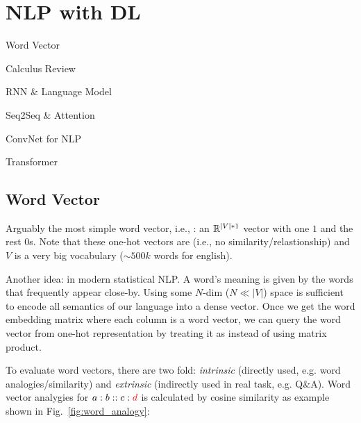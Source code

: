 \chapter{NLP with DL}\label{sec:nlp}


\begin{learningobjectives}
	\item Word Vector
	\item Calculus Review
	\item RNN \& Language Model
	\item Seq2Seq \& Attention
	\item ConvNet for NLP
	\item Transformer
\end{learningobjectives}



\section{Word Vector}

Arguably the most simple word vector, i.e., : an $\mathbb{R}^{|V| * 1}$ vector with one $1$ and the rest $0$s.
Note that these one-hot vectors are  (i.e., no similarity/relastionship) and $V$ is a very big vocabulary ($\sim 500k$ words for english).


Another idea:  in modern statistical NLP. A word's meaning is given by the words that frequently appear close-by.
Using some $N$-dim ($N \ll |V|$) space is sufficient to encode all semantics of our language into a dense vector.
Once we get the word embedding matrix where each column is a word vector, we can query the word vector from one-hot representation by treating it as  instead of using matrix product.


To evaluate word vectors, there are two fold: \emph{intrinsic} (directly used, e.g. word analogies/similarity) and \emph{extrinsic} (indirectly used in real task, e.g. Q\&A).
Word vector analygies for  $a:b :: c:\textcolor{red}{d}$ is calculated by cosine similarity as example shown in Fig.~\ref{fig:word_analogy}:


